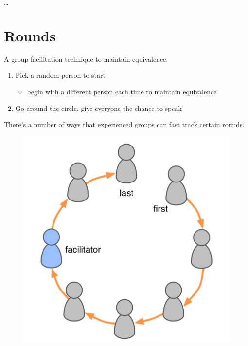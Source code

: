 {\ldots}

\section{Rounds}
\label{rounds}

A group facilitation technique to maintain equivalence.

\begin{enumerate}
\item Pick a random person to start

\begin{itemize}
\item begin with a different person each time to maintain equivalence

\end{itemize}

\item Go around the circle, give everyone the chance to speak

\end{enumerate}

There's a number of ways that experienced groups can fast track certain rounds.

\begin{figure}[htbp]
\centering
\includegraphics[keepaspectratio,width=\textwidth,height=0.75\textheight]{img/circle/rounds-new.png}
\end{figure}

